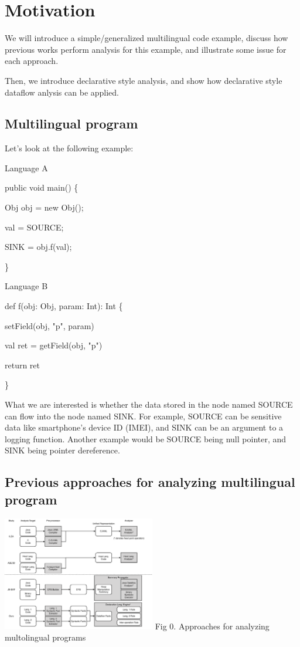 \section{Motivation}

We will introduce a simple/generalized multilingual code example, discuss how
previous works perform analysis for this example, and illustrate some issue for
each approach.

Then, we introduce declarative style analysis, and show how declarative style
dataflow anlysis can be applied.

\subsection{Multilingual program}

Let's look at the following example:

Language A

public void main() \{

  Obj obj = new Obj();

  val = SOURCE;

  SINK = obj.f(val);

\}

Language B

def f(obj: Obj, param: Int): Int \{

  setField(obj, "p", param)

  val ret = getField(obj, "p")

  return ret

\}

What we are interested is whether the data stored in the node named SOURCE can
flow into the node named SINK. For example, SOURCE can be sensitive data like
smartphone's device ID (IMEI), and SINK can be an argument to a logging function.
Another example would be SOURCE being null pointer, and SINK being pointer dereference.

\subsection{Previous approaches for analyzing multilingual program}

\includegraphics[width=0.5\textwidth]{img/compare}
Fig 0. Approaches for analyzing multolingual programs


